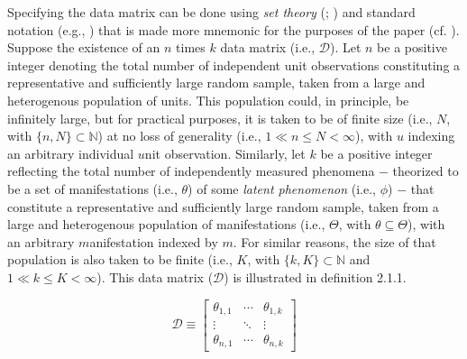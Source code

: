 \documentclass[
  10pt,
  a4paper,
  twoside]{article}
\begin{document}
Specifying the data matrix can be done using \emph{set theory} (; ) and standard notation (e.g., ) that is made more mnemonic for the purposes of the paper (cf. ). Suppose the existence of an \(n\) times \(k\) data matrix (i.e., \(\mathcal{D}\)). Let \(n\) be a positive integer denoting the total number of independent unit observations constituting a representative and sufficiently large random sample, taken from a large and heterogenous population of units. This population could, in principle, be infinitely large, but for practical purposes, it is taken to be of finite size (i.e., \(N\), with \(\{n, N\} \subset \mathbb{N}\)) at no loss of generality (i.e., \(1 \ll n \leq N < \infty\)), with \(u\) indexing an arbitrary individual \(u\)nit observation. Similarly, let \(k\) be a positive integer reflecting the total number of independently measured phenomena \(-\) theorized to be a set of manifestations (i.e., \(\theta\)) of some \emph{latent phenomenon} (i.e., \(\phi\)) \(-\) that constitute a representative and sufficiently large random sample, taken from a large and heterogenous population of manifestations (i.e., \(\Theta\), with \(\theta \subseteq \Theta\)), with an arbitrary \(m\)anifestation indexed by \(m\). For similar reasons, the size of that population is also taken to be finite (i.e., \(K\), with \(\{k, K\} \subset \mathbb{N}\) and \(1 \ll k \leq K < \infty\)). This data matrix (\(\mathcal{D}\)) is illustrated in definition 2.1.1.

\[
\mathcal{D} \equiv
\begin{bmatrix}
\theta_{1,1} & \cdots & \theta_{1,k} \\
\vdots & \ddots & \vdots \\ 
\theta_{n,1} & \cdots & \theta_{n,k}
\end{bmatrix}
\tag{2.1.1}
\]
\end{document}
